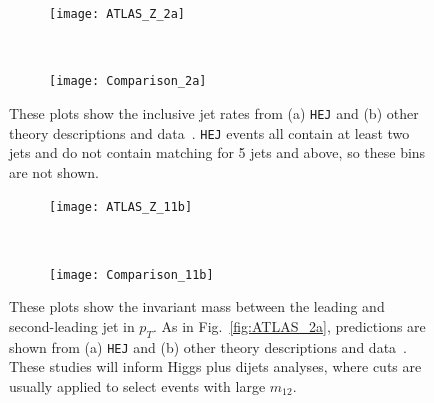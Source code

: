 		\begin{figure}[H]
		  \centering
		  \begin{subfigure}[b]{0.48\textwidth}
		    \texttt{[image: ATLAS\_Z\_2a]}
		    \label{fig:HEJ_ATLAS_2a}
		  \end{subfigure}
		  ~
		  \begin{subfigure}[b]{0.48\textwidth}
		    \texttt{[image: Comparison\_2a]}
		    \caption{}
		    \label{fig:MC_ATLAS_2a}
		  \end{subfigure}
		  \caption{These plots show the inclusive jet rates from (a) \texttt{HEJ} and (b) other
		    theory descriptions and data~\cite{Aad:2013ysa}.  \texttt{HEJ} events all contain at
		    least two jets and do not contain matching for 5 jets and above, so these
		    bins are not shown.}
		  \label{fig:ATLAS_2a}

		  \begin{subfigure}[b]{0.48\textwidth}
		    \texttt{[image: ATLAS\_Z\_11b]}
		    \caption{}
		    \label{fig:HEJ_ATLAS_11b}
		  \end{subfigure}
		  ~
		  \begin{subfigure}[b]{0.48\textwidth}
		    \texttt{[image: Comparison\_11b]}
		    \caption{}
		    \label{fig:MC_ATLAS_11b}
		  \end{subfigure}
		  \caption{These plots show the invariant mass between the leading and
		    second-leading jet in $p_T$.  As in Fig.~\eqref{fig:ATLAS_2a}, predictions are
		    shown from (a) \texttt{HEJ} and (b) other theory descriptions and
		    data~\cite{Aad:2013ysa}. These studies will inform Higgs plus dijets
		    analyses, where cuts are usually applied to select events with large
		    $m_{12}$.}
		  \label{fig:ATLAS_11b}
		\end{figure}

